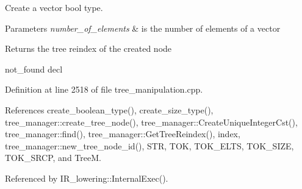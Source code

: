 Create a vector bool type. 


\begin{DoxyParams}{Parameters}
{\em number\+\_\+of\+\_\+elements} & is the number of elements of a vector \\
\hline
\end{DoxyParams}
\begin{DoxyReturn}{Returns}
the tree reindex of the created node 
\end{DoxyReturn}
not\+\_\+found decl 

Definition at line 2518 of file tree\+\_\+manipulation.\+cpp.



References create\+\_\+boolean\+\_\+type(), create\+\_\+size\+\_\+type(), tree\+\_\+manager\+::create\+\_\+tree\+\_\+node(), tree\+\_\+manager\+::\+Create\+Unique\+Integer\+Cst(), tree\+\_\+manager\+::find(), tree\+\_\+manager\+::\+Get\+Tree\+Reindex(), index, tree\+\_\+manager\+::new\+\_\+tree\+\_\+node\+\_\+id(), S\+TR, T\+OK, T\+O\+K\+\_\+\+E\+L\+TS, T\+O\+K\+\_\+\+S\+I\+ZE, T\+O\+K\+\_\+\+S\+R\+CP, and TreeM.



Referenced by I\+R\+\_\+lowering\+::\+Internal\+Exec().

